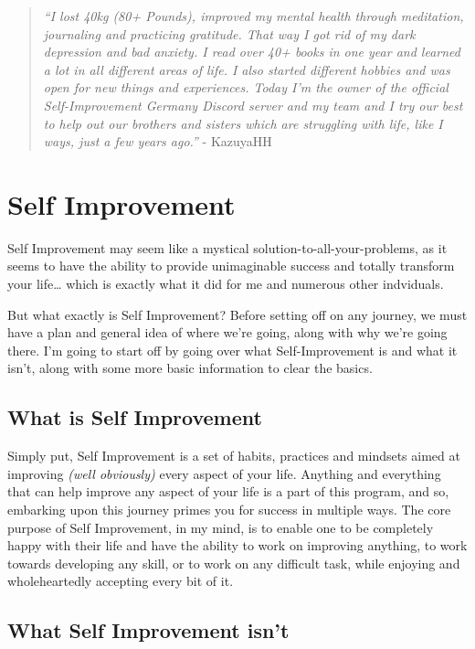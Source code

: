 \documentclass[
]{book}
\begin{document}
\begin{quote}
\emph{``I lost 40kg (80+ Pounds), improved my mental health through meditation, journaling and practicing gratitude. That way I got rid of my dark depression and bad anxiety. I read over 40+ books in one year and learned a lot in all different areas of life. I also started different hobbies and was open for new things and experiences. Today I'm the owner of the official Self-Improvement Germany Discord server and my team and I try our best to help out our brothers and sisters which are struggling with life, like I ways, just a few years ago.''} - KazuyaHH
\end{quote}

\hypertarget{self-improvement}{%
\chapter{Self Improvement}\label{self-improvement}}

Self Improvement may seem like a mystical solution-to-all-your-problems, as it seems to have the ability to provide unimaginable success and totally transform your life\ldots{} which is exactly what it did for me and numerous other indviduals.

But what exactly is Self Improvement? Before setting off on any journey, we must have a plan and general idea of where we're going, along with why we're going there. I'm going to start off by going over what Self-Improvement is and what it isn't, along with some more basic information to clear the basics.

\hypertarget{what-is-self-improvement}{%
\section{What is Self Improvement}\label{what-is-self-improvement}}

Simply put, Self Improvement is a set of habits, practices and mindsets aimed at improving \emph{(well obviously)} every aspect of your life. Anything and everything that can help improve any aspect of your life is a part of this program, and so, embarking upon this journey primes you for success in multiple ways. The core purpose of Self Improvement, in my mind, is to enable one to be completely happy with their life and have the ability to work on improving anything, to work towards developing any skill, or to work on any difficult task, while enjoying and wholeheartedly accepting every bit of it.

\hypertarget{what-self-improvement-isnt}{%
\section{What Self Improvement isn't}\label{what-self-improvement-isnt}}
\end{document}
